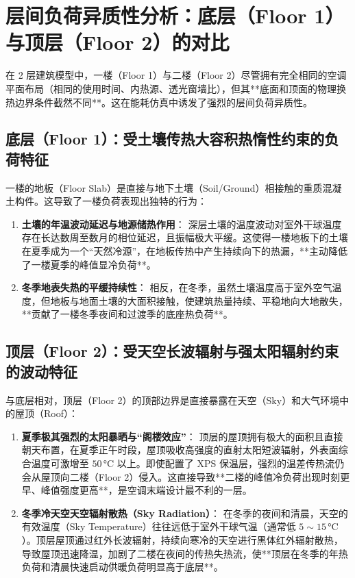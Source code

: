 \documentclass[11pt,a4paper]{article}
\begin{document}
\section{层间负荷异质性分析：底层（Floor 1）与顶层（Floor 2）的对比}

在 2 层建筑模型中，一楼（Floor 1）与二楼（Floor 2）尽管拥有完全相同的空调平面布局（相同的使用时间、内热源、透光窗墙比），但其**底面和顶面的物理换热边界条件截然不同**。这在能耗仿真中诱发了强烈的层间负荷异质性。

\subsection{底层（Floor 1）：受土壤传热大容积热惰性约束的负荷特征}
一楼的地板（Floor Slab）是直接与地下土壤（Soil/Ground）相接触的重质混凝土构件。这导致了一楼负荷表现出独特的行为：
\begin{enumerate}
    \item \textbf{土壤的年温波动延迟与地源储热作用}：
    深层土壤的温度波动对室外干球温度存在长达数周至数月的相位延迟，且振幅极大平缓。这使得一楼地板下的土壤在夏季成为一个“天然冷源”，在地板传热中产生持续向下的热漏，**主动降低了一楼夏季的峰值显冷负荷**。
    
    \item \textbf{冬季地表失热的平缓持续性}：
    相反，在冬季，虽然土壤温度高于室外空气温度，但地板与地面土壤的大面积接触，使建筑热量持续、平稳地向大地散失，**贡献了一楼冬季夜间和过渡季的底座热负荷**。
\end{enumerate}

\subsection{顶层（Floor 2）：受天空长波辐射与强太阳辐射约束的波动特征}
与底层相对，顶层（Floor 2）的顶部边界是直接暴露在天空（Sky）和大气环境中的屋顶（Roof）：
\begin{enumerate}
    \item \textbf{夏季极其强烈的太阳暴晒与“阁楼效应”}：
    顶层的屋顶拥有极大的面积且直接朝天布置，在夏季正午时段，屋顶吸收高强度的直射太阳短波辐射，外表面综合温度可激增至 $50\,\si{\degreeCelsius}$ 以上。即使配置了 XPS 保温层，强烈的温差传热流仍会从屋顶向二楼（Floor 2）侵入。这直接导致**二楼的峰值冷负荷出现时刻更早、峰值强度更高**，是空调末端设计最不利的一层。
    
    \item \textbf{冬季冷天空天空辐射散热（Sky Radiation）}：
    在冬季的夜间和清晨，天空的有效温度（Sky Temperature）往往远低于室外干球气温（通常低 $5 \sim 15\,\si{\degreeCelsius}$）。顶层屋顶通过红外长波辐射，持续向寒冷的天空进行黑体红外辐射散热，导致屋顶迅速降温，加剧了二楼在夜间的传热失热流，使**顶层在冬季的年热负荷和清晨快速启动供暖负荷明显高于底层**。
\end{enumerate}
\end{document}
